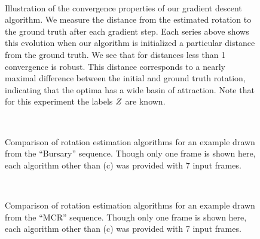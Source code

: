\begin{figure}[tb]
  \centering
  \\
  \caption{Illustration of the convergence properties of our gradient
    descent algorithm. We measure the distance from the estimated
    rotation to the ground truth after each gradient step. Each series
    above shows this evolution when our algorithm is initialized a
    particular distance from the ground truth. We see that for
    distances less than 1 convergence is robust. This distance
    corresponds to a nearly maximal difference between the initial and
    ground truth rotation, indicating that the optima has a wide basin
    of attraction. Note that for this experiment the labels
    $\Indicators$ are known.}
  \label{fig:rotation-convergence}
\end{figure}

\begin{figure}[tb]
  \centering
  \quad
  \\
  \quad
  \caption{Comparison of rotation estimation algorithms for an example
    drawn from the ``Bursary'' sequence. Though only one frame is
    shown here, each algorithm other than (c) was provided with 7
    input frames.}
  \label{fig:vpt-examples}
\end{figure}

\begin{figure}[tb]
  \centering
  \quad
  \\
  \quad
  \caption{Comparison of rotation estimation algorithms for an example
    drawn from the ``MCR'' sequence. Though only one frame is
    shown here, each algorithm other than (c) was provided with 7
    input frames.}
  \label{fig:vpt-examples}
\end{figure}

